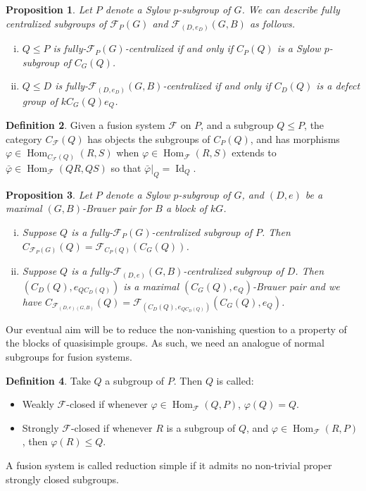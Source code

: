 \documentclass{amsart}
\theoremstyle{plain}\newtheorem{theorem}{Theorem}[section]
\theoremstyle{plain}\newtheorem{conjecture}[theorem]{Conjecture}
\theoremstyle{plain}\newtheorem{corollary}[theorem]{Corollary}
\theoremstyle{plain}\newtheorem{lemma}[theorem]{Lemma}
\theoremstyle{plain}\newtheorem{proposition}[theorem]{Proposition}
\theoremstyle{plain}\newtheorem{statement}[theorem]{}
\theoremstyle{definition}\newtheorem{definition}[theorem]{Definition}
\theoremstyle{definition}\newtheorem{example}[theorem]{Example}
\theoremstyle{definition}\newtheorem{examples}[theorem]{Examples}
\theoremstyle{definition}\newtheorem{notation}[theorem]{Notation}
\theoremstyle{definition}\newtheorem{remark}[theorem]{Remark}
\theoremstyle{definition}\newtheorem{remarks}[theorem]{Remarks}
\theoremstyle{definition}\newtheorem{question}[theorem]{Question}
\theoremstyle{definition}\newtheorem{propositiondefinition}[theorem]{Definition/Proposition}
\DeclareMathOperator{\Hom}{Hom}
\renewcommand{\phi}{\varphi}
\newcommand{\F}{\mathcal{F}}
\begin{document}
 \begin{proposition}\cite[8.1.4, 8.5.3]{linckelmann}\label{goodcentral} Let $P$ denote a Sylow $p$-subgroup of $G$. We can describe fully centralized subgroups of $\mathcal{F}_P(G)$ and $\mathcal{F}_{(D,e_D)}(G,B)$ as follows.
     \begin{enumerate}[(i)]
    \item $Q \leq P$ is fully-$\mathcal{F}_P(G)$-centralized if and only if $C_P(Q)$ is a Sylow $p$-subgroup of $C_G(Q)$.
    \item $Q \leq D$ is fully-$\mathcal{F}_{(D,e_D)}(G,B)$-centralized if and only if $C_D(Q)$ is a defect group of $kC_G(Q)e_Q$. 
     \end{enumerate}
 \end{proposition}  
 \begin{definition}\cite[4.26]{Craven} Given a fusion system $\mathcal{F}$ on $P$, and a subgroup $Q \leq P$, the category $C_\mathcal{F}(Q)$ has objects the subgroups of $C_{P}(Q)$, and has morphisms $\phi \in \Hom_{C_\F(Q)}(R,S)$ when $\phi \in \Hom_\F(R,S)$ extends to $\bar{\phi} \in \Hom_\F(QR, QS)$ so that $\bar{\phi}|_{Q} = \operatorname{Id}_Q$. 
 \end{definition}
 \begin{proposition}\cite[8.5.4, 8.3.11(ii)]{linckelmann}\label{prop:centralizerblock} Let $P$ denote a Sylow $p$-subgroup of $G$, and $(D,e)$ be a maximal $(G,B)$-Brauer pair for $B$ a block of $kG$.
 \begin{enumerate}[(i)]
 \item  Suppose $Q$ is a fully-$\mathcal{F}_{P}(G)$-centralized subgroup of $P$. Then $C_{\mathcal{F}_P(G)}(Q) = \mathcal{F}_{C_P(Q)}(C_G(Q))$.
 \item  Suppose $Q$ is a fully-$\mathcal{F}_{(D,e)}(G,B)$-centralized subgroup of $D$. Then $(C_D(Q), e_{QC_D(Q)})$ is a maximal $(C_G(Q),e_Q)$-Brauer pair and we have $C_{\mathcal{F}_{(D,e)(G,B)}}(Q) = \mathcal{F}_{(C_D(Q), e_{QC_D(Q)})}(C_G(Q),e_Q)$.  
\end{enumerate}
 \end{proposition}
 Our eventual aim will be to reduce the non-vanishing question to a property of the blocks of quasisimple groups. As such, we need an analogue of normal subgroups for fusion systems.
  \begin{definition}\cite[Definition 4.55]{Craven} Take $Q$ a subgroup of $P$. Then $Q$ is called:
 \begin{itemize}
     \item Weakly $\mathcal{F}$-closed if whenever $\phi \in \Hom_\F(Q,P)$, $\phi(Q)=Q$. 
     \item Strongly $\mathcal{F}$-closed if whenever $R$ is a subgroup of $Q$, and $\phi \in \Hom_\F(R,P)$, then $\phi(R) \leq Q$. 
     \end{itemize}
      A fusion system is called reduction simple if it admits no non-trivial proper strongly closed subgroups.
  \end{definition}
\end{document}

